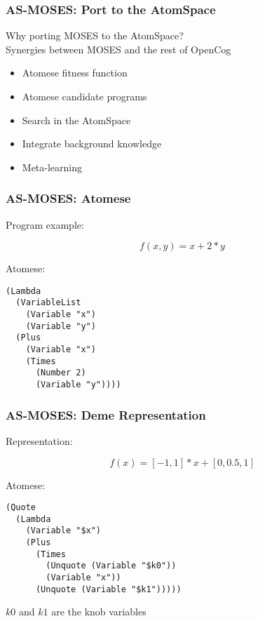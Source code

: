 \documentclass{beamer}
\begin{document}
\begin{frame}[fragile]
  \frametitle{AS-MOSES: Port to the AtomSpace}

  Why porting MOSES to the AtomSpace?\\

  \alert{Synergies between MOSES and the rest of OpenCog}\\

  \begin{itemize}
  \item Atomese fitness function
  \item Atomese candidate programs
  \item Search in the AtomSpace
  \item Integrate background knowledge
  \item Meta-learning
  \end{itemize}

\end{frame}

\begin{frame}[fragile]
  \frametitle{AS-MOSES: Atomese}
Program example:

$$f(x, y) = x + 2*y$$

Atomese:

{\small \begin{verbatim}
(Lambda
  (VariableList
    (Variable "x")
    (Variable "y")
  (Plus
    (Variable "x")
    (Times
      (Number 2)
      (Variable "y"))))
\end{verbatim}}

\end{frame}

\begin{frame}[fragile]
  \frametitle{AS-MOSES: Deme Representation}
Representation:

$$f(x) = [-1, 1]*x + [0, 0.5, 1]$$

Atomese:

{\small \begin{verbatim}
(Quote
  (Lambda
    (Variable "$x")
    (Plus
      (Times
        (Unquote (Variable "$k0"))
        (Variable "x"))
      (Unquote (Variable "$k1")))))
\end{verbatim}}

$k0$ and $k1$ are the knob variables

\end{frame}
\end{document}
